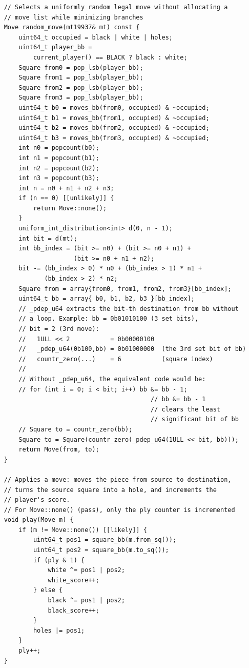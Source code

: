 \documentclass[12pt,a4paper,twoside,openright]{book}
\begin{document}
\begin{mdframed}[skipabove=\baselineskip,topline=false,rightline=false,bottomline=false,leftline=false,linewidth=1pt,linecolor=gray!40,innerleftmargin=8pt]
\begin{verbatim}
    // Selects a uniformly random legal move without allocating a
    // move list while minimizing branches
    Move random_move(mt19937& mt) const {
        uint64_t occupied = black | white | holes;
        uint64_t player_bb = 
            current_player() == BLACK ? black : white;
        Square from0 = pop_lsb(player_bb);
        Square from1 = pop_lsb(player_bb);
        Square from2 = pop_lsb(player_bb);
        Square from3 = pop_lsb(player_bb);
        uint64_t b0 = moves_bb(from0, occupied) & ~occupied;
        uint64_t b1 = moves_bb(from1, occupied) & ~occupied;
        uint64_t b2 = moves_bb(from2, occupied) & ~occupied;
        uint64_t b3 = moves_bb(from3, occupied) & ~occupied;
        int n0 = popcount(b0);
        int n1 = popcount(b1);
        int n2 = popcount(b2);
        int n3 = popcount(b3);
        int n = n0 + n1 + n2 + n3;
        if (n == 0) [[unlikely]] {
            return Move::none();
        }
        uniform_int_distribution<int> d(0, n - 1);
        int bit = d(mt);
        int bb_index = (bit >= n0) + (bit >= n0 + n1) + 
                       (bit >= n0 + n1 + n2);
        bit -= (bb_index > 0) * n0 + (bb_index > 1) * n1 + 
               (bb_index > 2) * n2;
        Square from = array{from0, from1, from2, from3}[bb_index];
        uint64_t bb = array{ b0, b1, b2, b3 }[bb_index];        
        // _pdep_u64 extracts the bit-th destination from bb without
        // a loop. Example: bb = 0b01010100 (3 set bits), 
        // bit = 2 (3rd move):
        //   1ULL << 2           = 0b00000100
        //   _pdep_u64(0b100,bb) = 0b01000000  (the 3rd set bit of bb)
        //   countr_zero(...)    = 6           (square index)
        //
        // Without _pdep_u64, the equivalent code would be:
        // for (int i = 0; i < bit; i++) bb &= bb - 1; 
                                            // bb &= bb - 1 
                                            // clears the least
                                            // significant bit of bb 
        // Square to = countr_zero(bb);                          
        Square to = Square(countr_zero(_pdep_u64(1ULL << bit, bb)));
        return Move(from, to);
    }

    // Applies a move: moves the piece from source to destination, 
    // turns the source square into a hole, and increments the 
    // player's score.
    // For Move::none() (pass), only the ply counter is incremented
    void play(Move m) {
        if (m != Move::none()) [[likely]] {
            uint64_t pos1 = square_bb(m.from_sq());
            uint64_t pos2 = square_bb(m.to_sq());
            if (ply & 1) {
                white ^= pos1 | pos2;
                white_score++;
            } else {
                black ^= pos1 | pos2;
                black_score++;
            }
            holes |= pos1;
        }
        ply++;
    }


\end{verbatim}
\end{mdframed}
\end{document}
